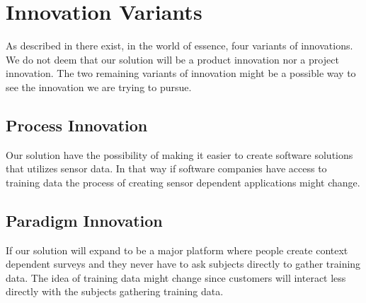 
\section{Innovation Variants}
\label{sec:innovation_variants}
As described in  there exist, in the world of essence, four variants of innovations. We do not deem that our solution will be a product innovation nor a project innovation. The two remaining variants of innovation might be a possible way to see the innovation we are trying to pursue.

\subsection{Process Innovation}
\label{sub:process_innovation}

Our solution have the possibility of making it easier to create software solutions that utilizes sensor data. In that way if software companies have access to training data the process of creating sensor dependent applications might change.

\subsection{Paradigm Innovation}
\label{sub:paradigm_innovation}

If our solution will expand to be a major platform where people create context dependent surveys and they never have to ask subjects directly to gather training data. The idea of training data might change since customers will interact less directly with the subjects gathering training data.